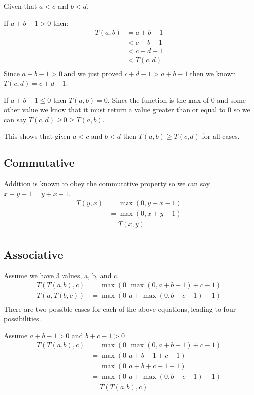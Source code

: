 \documentclass{article}
\begin{document}
Given that $a<c$ and $b<d$.

If $a+b-1 > 0$ then:
\begin{align*}
	T(a, b) &= a+b-1\\
			&< c+b-1\\
			&< c+d-1\\
			&< T(c,d)\\
\end{align*}
Since $a+b-1 > 0$ and we just proved $c+d-1 > a+b-1$ then we known $T(c, d) = c+d-1$.

If $a+b-1 \leq 0$ then $T(a,b) = 0$. Since the function is the max of 0 and some other value we know that it must return a value greater than or equal to 0 so we can say $T(c,d) \geq 0 \geq T(a,b)$.

This shows that given $a<c$ and $b<d$ then $T(a,b) \geq T(c,d)$ for all cases.

\subsection*{Commutative}
Addition is known to obey the commutative property so we can say $x+y-1 = y+x-1$.
\begin{align*}
	T(y,x) &=\max(0, y+x-1)\\
			&=\max(0, x+y-1)\\
			&=T(x,y)\\
\end{align*}
\subsection*{Associative}
Assume we have 3 values, a, b, and c.
\begin{align*}
	T(T(a,b),c) &= \max(0, \max(0, a+b-1) + c - 1)\\
	T(a,T(b,c)) &= \max(0, a + \max(0, b+c-1) - 1)\\
\end{align*}
There are two possible cases for each of the above equations, leading to four possibilities.

Assume $a+b-1 > 0$ and $b+c-1 > 0$
\begin{align*}
	T(T(a,b),c) &= \max(0, \max(0, a+b-1) + c - 1)\\
				&= \max(0, a+b-1 + c - 1)\\
				&= \max(0, a+b+c-1 - 1)\\
				&= \max(0, a+\max(0,b+c-1) - 1)\\
				&=T(T(a,b),c)
\end{align*}
\end{document}

